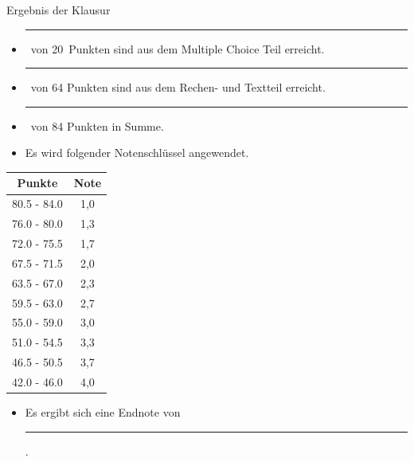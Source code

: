 \documentclass[a4paper, 9pt]{scrartcl}\usepackage[]{graphicx}\usepackage[]{xcolor}
\begin{document}
\begin{graybox}{Ergebnis der Klausur}
  \vspace{1Ex}
  \begin{itemize}
  \item[] \rule[0ex]{3em}{.4pt}\, von 20\, Punkten sind aus dem Multiple
    Choice Teil erreicht.
  \item[] \rule[0ex]{3em}{.4pt}\, von 64 Punkten sind aus dem Rechen- und
    Textteil erreicht. 
  \item[] \rule[0ex]{3em}{.4pt}\, von 84 Punkten in Summe.
  \item[] Es wird folgender Notenschl{\"u}ssel angewendet.   
  \end{itemize}
  \vspace{1ex}
\begin{center}
  \begin{tabular}[c]{cc}
    \toprule
    \textbf{Punkte}	&	\textbf{Note}	\\
    \midrule
    80.5 - 84.0	&	1,0	\\
    76.0 - 80.0	&	1,3	\\
    72.0 - 75.5	&	1,7	\\
    67.5 - 71.5	&	2,0	\\
    63.5 - 67.0	&	2,3	\\
    59.5 - 63.0	&	2,7	\\
    55.0 - 59.0	&	3,0	\\
    51.0 - 54.5	&	3,3	\\
    46.5 - 50.5	&	3,7	\\
    42.0 - 46.0	&	4,0	\\
    \bottomrule
  \end{tabular}
\end{center}
  \vspace{1ex}
\begin{itemize}
\item[] Es ergibt sich eine Endnote von \rule[0ex]{4em}{.4pt}.
\end{itemize}
  \vspace{1Ex}
\end{graybox}

\newpage
\end{document}
